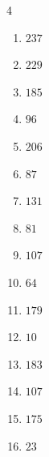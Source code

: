 \begin{multicols}{4}
\begin{enumerate}
  \item $237$


  \item $229$


  \item $185$


  \item $96$


  \item $206$


  \item $87$


\columnbreak %

  \item $131$


  \item $81$


  \item $107$


  \item $64$


  \item $179$


  \item $10$


  \item $183$


  \item $107$


  \item $175$


  \item $23$


\end{enumerate}
\end{multicols}
